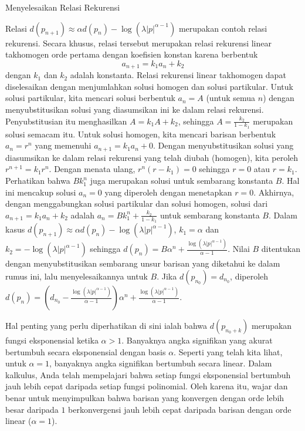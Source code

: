 \begin{digression}{Menyelesaikan Relasi Rekurensi} 

\noindent Relasi $d(p_{n+1})\approx\alpha d(p_{n})-\log\left(\lambda|p|^{\alpha-1}\right)$
merupakan contoh relasi rekurensi. Secara khusus, relasi tersebut
merupakan relasi rekurensi linear takhomogen orde pertama dengan koefisien
konstan karena berbentuk
\[
a_{n+1}=k_{1}a_{n}+k_{2}
\]
dengan $k_{1}$ dan $k_{2}$ adalah konstanta. Relasi rekurensi linear
takhomogen dapat diselesaikan dengan menjumlahkan solusi homogen dan
solusi partikular. Untuk solusi partikular, kita mencari solusi berbentuk
$a_{n}=A$ (untuk semua $n$) dengan menyubstitusikan solusi yang
diasumsikan ini ke dalam relasi rekurensi. Penyubstitusian itu menghasilkan
$A=k_{1}A+k_{2}$, sehingga $A=\frac{k_{2}}{1-k_{1}}$ merupakan solusi
semacam itu. Untuk solusi homogen, kita mencari barisan berbentuk
$a_{n}=r^{n}$ yang memenuhi $a_{n+1}=k_{1}a_{n}+0$. Dengan menyubstitusikan
solusi yang diasumsikan ke dalam relasi rekurensi yang telah diubah
(homogen), kita peroleh $r^{n+1}=k_{1}r^{n}$. Dengan menata ulang,
$r^{n}(r-k_{1})=0$ sehingga $r=0$ atau $r=k_{1}$. Perhatikan bahwa
$Bk_{1}^{n}$ juga merupakan solusi untuk sembarang konstanta $B$.
Hal ini mencakup solusi $a_{n}=0$ yang diperoleh dengan menetapkan
$r=0$. Akhirnya, dengan menggabungkan solusi partikular dan solusi
homogen, solusi dari $a_{n+1}=k_{1}a_{n}+k_{2}$ adalah $a_{n}=Bk_{1}^{n}+\frac{k_{2}}{1-k_{1}}$
untuk sembarang konstanta $B$. Dalam kasus $d(p_{n+1})\approx\alpha d(p_{n})-\log\left(\lambda|p|^{\alpha-1}\right)$,
$k_{1}=\alpha$ dan $k_{2}=-\log\left(\lambda|p|^{\alpha-1}\right)$
sehingga $d(p_{n})=B\alpha^{n}+\frac{\log\left(\lambda|p|^{\alpha-1}\right)}{\alpha-1}$.
Nilai $B$ ditentukan dengan menyubstitusikan sembarang unsur barisan
yang diketahui ke dalam rumus ini, lalu menyelesaikannya untuk $B$.
Jika $d(p_{n_{0}})=d_{n_{0}}$, diperoleh $d(p_{n})=\left(d_{n_{0}}-\frac{\log\left(\lambda|p|^{\alpha-1}\right)}{\alpha-1}\right)\alpha^{n}+\frac{\log\left(\lambda|p|^{\alpha-1}\right)}{\alpha-1}$. 

\noindent\end{digression}  

\noindent Hal penting yang perlu diperhatikan di sini ialah bahwa
$d(p_{n_{0}+k})$ merupakan fungsi eksponensial ketika $\alpha>1$.
Banyaknya angka signifikan yang akurat bertumbuh secara eksponensial
dengan basis $\alpha$. Seperti yang telah kita lihat, untuk $\alpha=1$,
banyaknya angka signifikan bertumbuh secara linear. Dalam kalkulus,
Anda telah mempelajari bahwa setiap fungsi eksponensial bertumbuh
jauh lebih cepat daripada setiap fungsi polinomial. Oleh karena itu,
wajar dan benar untuk menyimpulkan bahwa barisan yang konvergen dengan
orde lebih besar daripada $1$ berkonvergensi jauh lebih cepat daripada
barisan dengan orde linear ($\alpha=1$). 

